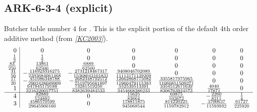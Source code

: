 \documentclass[letterpaper,10pt,english]{sphinxmanual}
\begin{document}
\subsection{ARK-6-3-4 (explicit)}
\label{Butcher:butcher-ark-6-3-4-e}\label{Butcher:ark-6-3-4-explicit}
Butcher table number 4
for {\hyperref[c_interface/User_callable:c.ARKodeSetERKTableNum]{\emph{}}}.  This is
the explicit portion of the default 4th order additive method (from \label{Butcher:id4}{\hyperref[References:kc2003]{\emph{{[}KC2003{]}}}}).
\begin{gather}
\begin{split}\begin{array}{r|cccccc}
  0 & 0 & 0 & 0 & 0 & 0 & 0 \\
  \frac12 & \frac12 & 0 & 0 & 0 & 0 & 0 \\
  \frac{83}{250} & \frac{13861}{62500} & \frac{6889}{62500} & 0 & 0 & 0 & 0 \\
  \frac{31}{50} & -\frac{116923316275}{2393684061468} & -\frac{2731218467317}{15368042101831} & \frac{9408046702089}{11113171139209} & 0 & 0 & 0 \\
  \frac{17}{20} & -\frac{451086348788}{2902428689909} & -\frac{2682348792572}{7519795681897} & \frac{12662868775082}{11960479115383} & \frac{3355817975965}{11060851509271} & 0 & 0 \\
  1 & \frac{647845179188}{3216320057751} & \frac{73281519250}{8382639484533} & \frac{552539513391}{3454668386233} & \frac{3354512671639}{8306763924573} & \frac{4040}{17871} & 0 \\
  \hline
  4 & \frac{82889}{524892} & 0 & \frac{15625}{83664} & \frac{69875}{102672} & -\frac{2260}{8211} & \frac14 \\
  3 & \frac{4586570599}{29645900160} & 0 & \frac{178811875}{945068544} & \frac{814220225}{1159782912} & -\frac{3700637}{11593932} & \frac{61727}{225920}
\end{array}\end{split}\notag
\end{gather}\begin{figure}[htbp]
\centering
\capstart


\end{figure}
\end{document}
